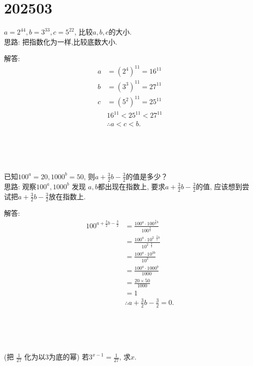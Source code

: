 \section{202503}

\item{
    $a=2^{44}, b=3^{33}, c=5^{22}$, 比较$a, b, c$的大小.
    \ifshowSolution
    \fangsong{}
    \\
    思路: 把指数化为一样,比较底数大小.

    解答: 
    \begin{align*}
        a &= (2^4)^{11} = 16^{11}\\
        b &= (3^3)^{11} = 27^{11}\\
        c &= (5^2)^{11} = 25^{11}\\
        & 16^{11} < 25^{11} < 27^{11}\\
        &\therefore a < c < b.
    \end{align*}
    \fi
}
\\ \\ \\

\item{
    已知$100^a=20, 1000^b=50$, 则$a+\frac{3}{2}b-\frac{3}{2}$的值是多少？
    \ifshowSolution
    \fangsong{}
    \\
    思路: 观察$100^a, 1000^b$ 发现 $a,b$都出现在指数上, 要求$a+\frac{3}{2}b-\frac{3}{2}$的值, 应该想到尝试把$a+\frac{3}{2}b-\frac{3}{2}$放在指数上.

    解答: 
    \begin{align*}
        100^{a+\frac{3}{2}b-\frac{3}{2}} &= \frac{100^a\cdot 100^{\frac{3}{2}b}}{100^\frac{3}{2}}\\
        &= \frac{100^a\cdot 10^{2\cdot \frac{3}{2}b}}{10^{2\cdot\frac{3}{2}}}\\
        &= \frac{100^a\cdot 10^{3b}} {10^{3}}\\
        &= \frac{100^a\cdot 1000^{b}} {1000}\\
        &= \frac{20\times 50} {1000}\\
        &= 1\\
        &\therefore a+\frac{3}{2}b-\frac{3}{2} = 0.
    \end{align*}
    \fi
}
\\ \\ \\

\item{
    (把 $\frac{1}{27}$ 化为以3为底的幂) 若$3^{x-1}=\frac{1}{27}$, 求$x$.
}
\\ \\ \\

